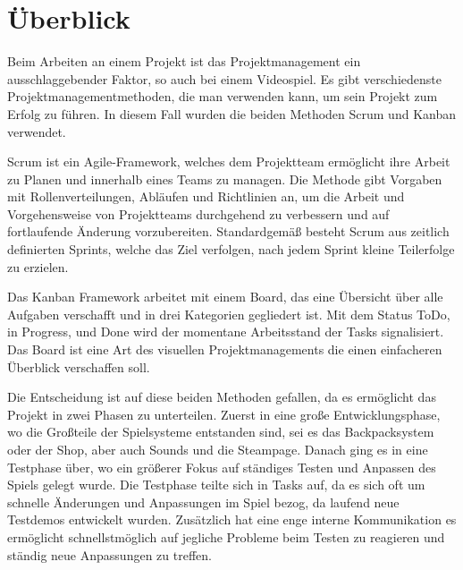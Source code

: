 
\section{Überblick}\label{sec:ueberblick}

\renewcommand{\kapitelautor}{Autor: Nils Hubmann} %

%
Beim Arbeiten an einem Projekt ist das Projektmanagement ein ausschlaggebender Faktor, so auch bei einem Videospiel. Es gibt verschiedenste Projektmanagementmethoden, die man verwenden kann, um sein Projekt zum Erfolg zu führen.
In diesem Fall wurden die beiden Methoden Scrum und Kanban verwendet.

Scrum ist ein Agile-Framework, welches dem Projektteam ermöglicht ihre Arbeit zu Planen und innerhalb eines Teams zu managen.
Die Methode gibt Vorgaben mit Rollenverteilungen, Abläufen und Richtlinien an, um die Arbeit und Vorgehensweise von Projektteams durchgehend zu verbessern und auf fortlaufende Änderung vorzubereiten.
Standardgemäß besteht Scrum aus zeitlich definierten Sprints, welche das Ziel verfolgen, nach jedem Sprint kleine Teilerfolge zu erzielen. 


\cite{Scrum}


Das Kanban Framework arbeitet mit einem Board, das eine Übersicht über alle Aufgaben verschafft und in drei Kategorien gegliedert ist.
Mit dem Status ToDo, in Progress, und Done wird der momentane Arbeitsstand der Tasks signalisiert. Das Board ist eine Art des visuellen Projektmanagements die einen einfacheren Überblick verschaffen soll.


Die Entscheidung ist auf diese beiden Methoden gefallen, da es ermöglicht das Projekt in zwei Phasen zu unterteilen.
Zuerst in eine große Entwicklungsphase, wo die Großteile der Spielsysteme entstanden sind, sei es das Backpacksystem oder der Shop, aber auch Sounds und die Steampage.
Danach ging es in eine Testphase über, wo ein größerer Fokus auf ständiges Testen und Anpassen des Spiels gelegt wurde.
Die Testphase teilte sich in Tasks auf, da es sich oft um schnelle Änderungen und Anpassungen im Spiel bezog, da laufend neue Testdemos entwickelt wurden.
Zusätzlich hat eine enge interne Kommunikation es ermöglicht schnellstmöglich auf jegliche Probleme beim Testen zu reagieren und ständig neue Anpassungen zu treffen.

%

\renewcommand{\kapitelautor}{}
